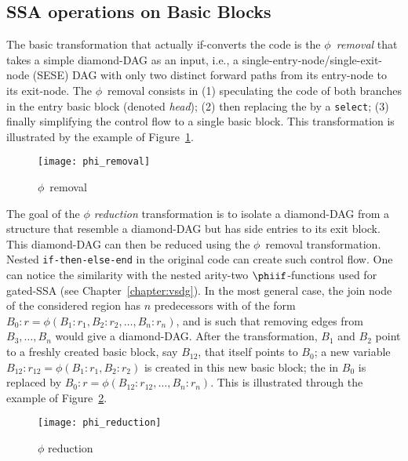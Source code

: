 \subsection{SSA operations on Basic Blocks}

The basic transformation that actually if-converts the code is the \emph{$\phi$~removal} that takes a simple diamond-DAG  as an input, i.e., a single-entry-node/single-exit-node (SESE) DAG with only two distinct forward paths from its entry-node to its exit-node. The $\phi$~removal consists in (1) speculating the code of both branches in the entry basic block (denoted \textit{head}); (2) then replacing the \phifun by a \texttt{select}; (3) finally simplifying the control flow to a single basic block. This transformation is illustrated by the example of Figure~\ref{fig:phi_rem}. 
\begin{figure}[h]
  \texttt{[image: phi\_removal]}
  \caption{$\phi$~removal\label{fig:phi_rem}}
\end{figure}

The goal of the \emph{$\phi$ reduction} transformation is to isolate a diamond-DAG from a structure that resemble a diamond-DAG but has side entries to its exit block. This diamond-DAG can then be reduced using the $\phi$~removal transformation. Nested \texttt{if-then-else-end} in the original code can create such control flow. One can notice the similarity with the nested arity-two $\phiif$-functions used for gated-SSA (see Chapter~\ref{chapter:vsdg}). In the most general case, the join node of the considered region has $n$ predecessors with \phifuns of the form $B_0:r=\phi(B_1:r_1,B_2:r_2,\dots,B_n:r_n)$, and is such that removing edges from $B_3,\dots, B_n$ would give a diamond-DAG. After the transformation, $B_1$ and $B_2$ point to a freshly created basic block, say $B_{12}$, that itself points to $B_0$; a new variable $B_{12}:r_{12}=\phi(B_1:r_1,B_2:r_2)$ is created in this new basic block; the \phifun in $B_0$ is replaced by $B_0:r=\phi(B_{12}:r_{12},\dots,B_n:r_n)$. This is illustrated through the example of Figure~\ref{fig:phi_red}.
\begin{figure}[h]
  \texttt{[image: phi\_reduction]}
  \caption{\label{fig:phi_red}$\phi$ reduction}
\end{figure}

